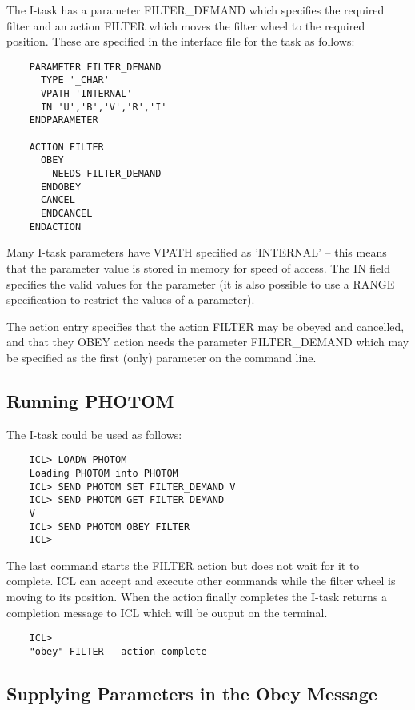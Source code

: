 \documentclass[twoside,11pt]{report}
\newcommand{\xlabel}[1]{}
\begin{document}
The I-task has a parameter FILTER\_DEMAND which specifies the required filter
and an action FILTER which moves the filter wheel to the required position.
These are specified in the interface file for the task as follows:

\begin{verbatim}
    PARAMETER FILTER_DEMAND
      TYPE '_CHAR'
      VPATH 'INTERNAL'
      IN 'U','B','V','R','I'
    ENDPARAMETER

    ACTION FILTER
      OBEY
        NEEDS FILTER_DEMAND
      ENDOBEY
      CANCEL
      ENDCANCEL
    ENDACTION
\end{verbatim}

Many I-task parameters have VPATH specified as 'INTERNAL' --
this means that the parameter value is stored in memory for speed of access.
The IN field
specifies the valid values for the parameter (it is also possible to use
a RANGE specification to restrict the values of a parameter).

The action entry specifies that the action FILTER may be obeyed and
cancelled, and that they OBEY action needs the parameter FILTER\_DEMAND which
may be specified as the first (only) parameter on the command line.


\subsection{\xlabel{running_photom}Running PHOTOM}

The I-task could be used as follows:

\begin{verbatim}
    ICL> LOADW PHOTOM
    Loading PHOTOM into PHOTOM
    ICL> SEND PHOTOM SET FILTER_DEMAND V
    ICL> SEND PHOTOM GET FILTER_DEMAND
    V
    ICL> SEND PHOTOM OBEY FILTER
    ICL>
\end{verbatim}

The last command starts the FILTER action but does not wait for it to complete.
ICL can accept and execute other commands while the filter wheel is moving
to its position. When the action finally completes the I-task returns a
completion message to ICL which will be output on the terminal.

\begin{verbatim}
    ICL>
    "obey" FILTER - action complete
\end{verbatim}

\subsection{\xlabel{supplying_parameters_in_the_obey_message}Supplying Parameters in the Obey Message}
\end{document}

